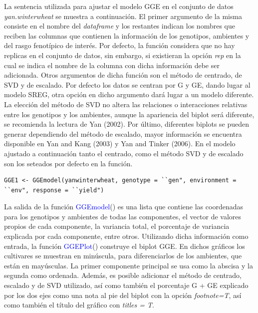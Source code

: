 La sentencia utilizada para ajustar el modelo GGE en el conjunto de datos \emph{yan.winterwheat} se muestra a continuación. El primer argumento de la misma consiste en el nombre del \emph{dataframe} y los restantes indican los nombres que reciben las columnas que contienen la información de los genotipos, ambientes y del rasgo fenotípico de interés. Por defecto, la función considera que no hay replicas en el conjunto de datos, sin embargo, si existieran la opción \emph{rep} en la cual se indica el nombre de la columna con dicha información debe ser adicionada. Otros argumentos de dicha función son el método de centrado, de SVD y de escalado. Por defecto los datos se centran por G y GE, dando lugar al modelo SREG, otra opción en dicho argumento dará lugar a un modelo diferente. La elección del método de SVD no altera las relaciones o interacciones relativas entre los genotipos y los ambientes, aunque la apariencia del biplot será diferente, se recomienda la lectura de Yan (2002). Por último, diferentes biplots se pueden generar dependiendo del método de escalado, mayor información se encuentra disponible en Yan and Kang (2003) y Yan and Tinker (2006). En el modelo ajustado a continuación tanto el centrado, como el método SVD y de escalado son los seteados por defecto en la función.

\begin{tcolorbox}[colframe=aurometalsaurus,colback=backcolour,colbacklower=white,
   				width=1\linewidth,
    			height=0.1\linewidth,
    			boxsep=-3mm]
\begin{lstlisting}
GGE1 <- GGEmodel(yanwinterwheat, genotype = ``gen", environment = ``env", response = ``yield")
\end{lstlisting}
\end{tcolorbox}

La salida de la función \textcolor{blue}{GGEmodel}() es una lista que contiene las coordenadas para los genotipos y ambientes de todas las componentes, el vector de valores propios de cada componente, la variancia total, el porcentaje de variancia explicada por cada componente, entre otros. Utilizando dicha información como entrada, la función \textcolor{blue}{GGEPlot}() construye el biplot GGE. En dichos gráficos los cultivares se muestran en minúscula, para diferenciarlos de los ambientes, que están en mayúsculas. La primer componente principal se usa como la abscisa y la segunda como ordenada. Además, es posible adicionar el método de centrado, escalado y de SVD utilizado, así como también el porcentaje G + GE explicado por los dos ejes como una nota al pie del biplot con la opción \emph{footnote=T}, así como también el título del gráfico con \emph{titles = T}. 


